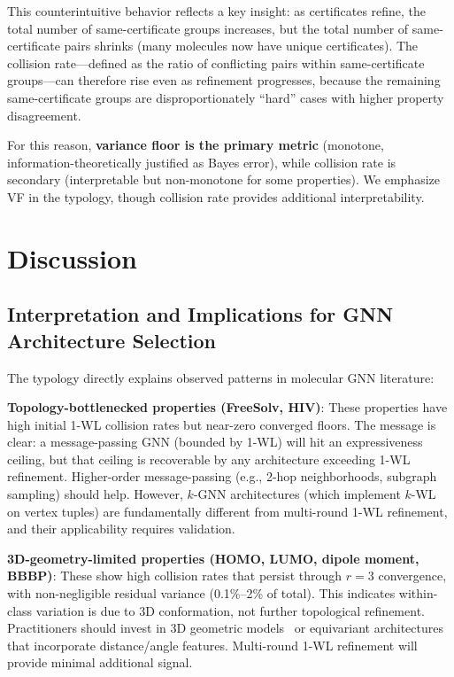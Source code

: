 \documentclass[11pt,letterpaper]{article}
\begin{document}
This counterintuitive behavior reflects a key insight: as certificates refine, the total number of same-certificate groups increases, but the total number of same-certificate pairs shrinks (many molecules now have unique certificates). The collision rate---defined as the ratio of conflicting pairs within same-certificate groups---can therefore rise even as refinement progresses, because the remaining same-certificate groups are disproportionately ``hard'' cases with higher property disagreement.

For this reason, \textbf{variance floor is the primary metric} (monotone, information-theoretically justified as Bayes error), while collision rate is secondary (interpretable but non-monotone for some properties). We emphasize VF in the typology, though collision rate provides additional interpretability.

\section{Discussion}

\subsection{Interpretation and Implications for GNN Architecture Selection}

The typology directly explains observed patterns in molecular GNN literature:

\textbf{Topology-bottlenecked properties (FreeSolv, HIV)}: These properties have high initial 1-WL collision rates but near-zero converged floors. The message is clear: a message-passing GNN (bounded by 1-WL) will hit an expressiveness ceiling, but that ceiling is recoverable by any architecture exceeding 1-WL refinement. Higher-order message-passing (e.g., 2-hop neighborhoods, subgraph sampling) should help. However, $k$-GNN architectures (which implement $k$-WL on vertex tuples) are fundamentally different from multi-round 1-WL refinement, and their applicability requires validation.

\textbf{3D-geometry-limited properties (HOMO, LUMO, dipole moment, BBBP)}: These show high collision rates that persist through $r=3$ convergence, with non-negligible residual variance (0.1\%--2\% of total). This indicates within-class variation is due to 3D conformation, not further topological refinement. Practitioners should invest in 3D geometric models~\citep{Schutt2017,Gasteiger2020} or equivariant architectures that incorporate distance/angle features. Multi-round 1-WL refinement will provide minimal additional signal.
\end{document}
